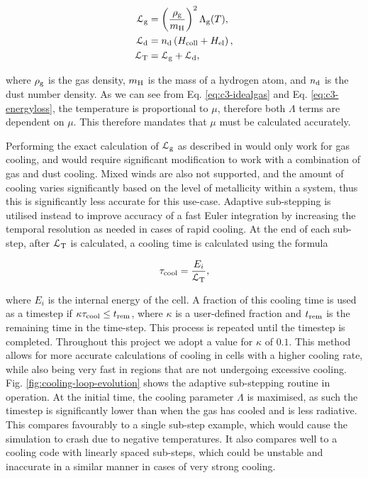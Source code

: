 \begin{subequations}
  \begin{align}
    \mathcal{L}_\text{g} & = \left( \frac{\rho_\text{g}}{m_\text{H}} \right)^2 \Lambda_\text{g}(T) ,  \\
    \mathcal{L}_\text{d} & = n_\text{d} \left( H_\text{coll} + H_\text{el} \right) , \\ 
    \mathcal{L}_\text{T} & = \mathcal{L}_\text{g} + \mathcal{L}_\text{d} , \label{eq:c3-energyloss} 
  \end{align}
\end{subequations}

\noindent
where $\rho_\text{g}$ is the gas density,
$m_\text{H}$ is the mass of a hydrogen atom,
and
$n_\text{d}$ is the dust number density.
As we can see from Eq. \ref{eq:c3-idealgas} and Eq. \ref{eq:c3-energyloss}, the temperature is proportional to $\mu$, therefore both $\Lambda$ terms are dependent on $\mu$.
This therefore mandates that $\mu$ must be calculated accurately.


Performing the exact calculation of $\mathcal{L}_\text{g}$ as described in \textcite{townsendExactIntegrationScheme2009} would only work for gas cooling, and would require significant modification to work with a combination of gas and dust cooling.
Mixed winds are also not supported, and the amount of cooling varies significantly based on the level of metallicity within a system, thus this is significantly less accurate for this use-case.
Adaptive sub-stepping is utilised instead to improve accuracy of a fast Euler integration by increasing the temporal resolution as needed in cases of rapid cooling.
At the end of each sub-step, after $\mathcal{L}_\text{T}$ is calculated, a cooling time is calculated using the formula

\begin{equation}
  \label{eq:substepinterval}
  \tau_\text{cool} = \frac{E_i}{\mathcal{L}_\text{T}} ,
\end{equation}

\noindent
where $E_i$ is the internal energy of the cell.
A fraction of this cooling time is used as a timestep if $\kappa \tau_\text{cool} \leq t_\text{rem}$, where $\kappa$ is a user-defined fraction and $t_\text{rem}$ is the remaining time in the time-step.
This process is repeated until the timestep is completed.
Throughout this project we adopt a value for $\kappa$ of $0.1$.
This method allows for more accurate calculations of cooling in cells with a higher cooling rate, while also being very fast in regions that are not undergoing excessive cooling.
Fig. \ref{fig:cooling-loop-evolution} shows the adaptive sub-stepping routine in operation.
At the initial time, the cooling parameter $\Lambda$ is maximised, as such the timestep is significantly lower than when the gas has cooled and is less radiative.
This compares favourably to a single sub-step example, which would cause the simulation to crash due to negative temperatures.
It also compares well to a cooling code with linearly spaced sub-steps, which could be unstable and inaccurate in a similar manner in cases of very strong cooling.

